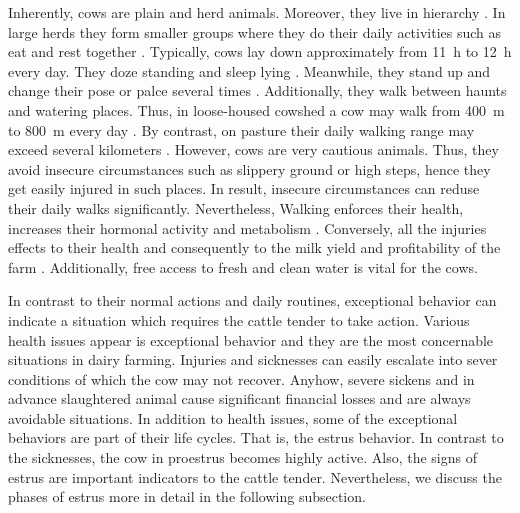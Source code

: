 \documentclass[english,12pt,a4paper,pdftex,elec,utf8]{aaltothesis}
\begin{document}
Inherently, cows are plain and herd animals. Moreover, they live in hierarchy \cite{julkaisuja52}. In large herds they form smaller groups where they do their daily activities such as eat and rest together \cite{julkaisuja52} \cite{lehmahavaintoja}. Typically, cows lay down approximately from \SI{11}{\hour} to \SI{12}{\hour} every day. They doze standing and sleep lying \cite{julkaisuja52}. Meanwhile, they stand up and change their pose or palce several times \cite{luomunaudanruokinta}. Additionally, they walk between haunts and watering places. Thus, in loose-housed cowshed a cow may walk from  \SI{400}{\metre} to \SI{800}{\metre} every day \cite{luomuopas}. By contrast, on pasture their daily walking range may exceed several kilometers \cite{luomuopas} \cite{julkaisuja52}. However, cows are very cautious animals. Thus, they avoid insecure circumstances such as slippery ground or high steps, hence they get easily injured in such places. In result, insecure circumstances can reduse their daily walks significantly. Nevertheless, Walking enforces their health, increases their hormonal activity and metabolism \cite{luomuopas}. Conversely, all the injuries effects to their health and consequently to the milk yield and profitability  of the farm \cite{lehmahavaintoja}. Additionally,  free access to fresh and clean water is vital for the cows. \cite{luomuopas} 

In contrast to their normal actions and daily routines, exceptional behavior can indicate a situation which requires the cattle tender to take action. Various health issues appear is exceptional behavior and they are the most concernable situations in dairy farming. Injuries and sicknesses can easily escalate into sever conditions of which the cow may not recover. Anyhow, severe sickens and in advance slaughtered animal cause significant financial losses and are always avoidable situations. In addition to health issues, some of the exceptional behaviors are part of their life cycles. That is, the estrus behavior. In contrast to the sicknesses, the cow in proestrus becomes highly active. Also, the signs of estrus are important indicators to the cattle tender. Nevertheless, we discuss the phases of estrus more in detail in the following subsection.


 
\end{document}
